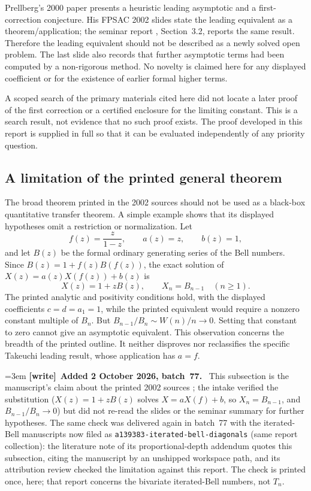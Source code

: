 \documentclass[11pt,letterpaper]{article}
\theoremstyle{remark}\newtheorem{remark}[theorem]{Remark}
\newenvironment{writenote}[1][]{\par\smallskip\begingroup\small\emergencystretch=3em
 \noindent\textbf{[write]}\if\relax\detokenize{#1}\relax\else~\textbf{#1.}\fi\ }%
 {\par\endgroup\smallskip}
\begin{document}
Prellberg's 2000 paper \cite{prellberg2000} presents a heuristic leading asymptotic and a first-correction conjecture. His FPSAC 2002 slides \cite{prellberg2002} state the leading equivalent as a theorem/application; the seminar report \cite{mishna2005}, Section~3.2, reports the same result. Therefore the leading equivalent should not be described as a newly solved open problem. The last slide also records that further asymptotic terms had been computed by a non-rigorous method. No novelty is claimed here for any displayed coefficient or for the existence of earlier formal higher terms.

A scoped search of the primary materials cited here did not locate a later proof of the first correction or a certified enclosure for the limiting constant. This is a search result, not evidence that no such proof exists. The proof developed in this report is supplied in full so that it can be evaluated independently of any priority question.

\subsection{A limitation of the printed general theorem}\label{tak:sec:limitation}
The broad theorem printed in the 2002 sources should not be used as a black-box quantitative transfer theorem. A simple example shows that its displayed hypotheses omit a restriction or normalization. Let
\[
 f(z)=\frac{z}{1-z},\qquad a(z)=z,\qquad b(z)=1,
\]
and let $B(z)$ be the formal ordinary generating series of the Bell numbers. Since $B(z)=1+f(z)B(f(z))$, the exact solution of
$X(z)=a(z)X(f(z))+b(z)$ is
\[
 X(z)=1+zB(z),\qquad X_n=B_{n-1}\quad(n\geq1).
\]
The printed analytic and positivity conditions hold, with the displayed coefficients $c=d=a_1=1$, while the printed equivalent would require a nonzero constant multiple of $B_n$. But $B_{n-1}/B_n\sim W(n)/n\to0$. Setting that constant to zero cannot give an asymptotic equivalent. This observation concerns the breadth of the printed outline. It neither disproves nor reclassifies the specific Takeuchi leading result, whose application has $a=f$.

\begin{writenote}[Added 2 October 2026, batch~77]
This subsection is the manuscript's claim about the printed 2002 sources
\cite{prellberg2002,mishna2005}; the intake verified the substitution
($X(z)=1+zB(z)$ solves $X=aX(f)+b$, so $X_n=B_{n-1}$, and $B_{n-1}/B_n\to0$)
but did not re-read the slides or the seminar summary for further hypotheses.
The same check was delivered again in batch~77 with the iterated-Bell
manuscripts now filed as \texttt{a139383-\allowbreak iterated-\allowbreak bell-\allowbreak diagonals}
(same report collection): the literature note of its proportional-depth
addendum quotes this subsection, citing the manuscript by an unshipped workspace
path, and its attribution review checked the limitation against this report.
The check is printed once, here; that report concerns the bivariate
iterated-Bell numbers, not $T_n$.
\end{writenote}
\end{document}
